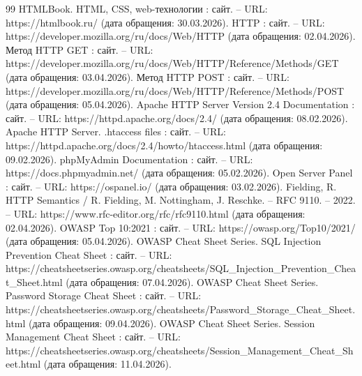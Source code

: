 \begin{thebibliography}{99}
	 HTMLBook. HTML, CSS, web-технологии : сайт. -- URL: https://htmlbook.ru/ (дата обращения: 30.03.2026).
	 HTTP : сайт. -- URL: https://developer.mozilla.org/ru/docs/Web/HTTP (дата обращения: 02.04.2026).
	 Метод HTTP GET : сайт. -- URL: https://developer.mozilla.org/ru/docs/Web/HTTP/Reference/Methods/GET (дата обращения: 03.04.2026).
	 Метод HTTP POST : сайт. -- URL: https://developer.mozilla.org/ru/docs/Web/HTTP/Reference/Methods/POST (дата обращения: 05.04.2026).
	 Apache HTTP Server Version 2.4 Documentation : сайт. -- URL: https://httpd.apache.org/docs/2.4/ (дата обращения: 08.02.2026).
	 Apache HTTP Server. .htaccess files : сайт. -- URL: https://httpd.apache.org/docs/2.4/howto/htaccess.html (дата обращения: 09.02.2026).
	 phpMyAdmin Documentation : сайт. -- URL: https://docs.phpmyadmin.net/ (дата обращения: 05.02.2026).
	 Open Server Panel : сайт. -- URL: https://ospanel.io/ (дата обращения: 03.02.2026).
	 Fielding, R. HTTP Semantics / R. Fielding, M. Nottingham, J. Reschke. -- RFC 9110. -- 2022. -- URL: https://www.rfc-editor.org/rfc/rfc9110.html (дата обращения: 02.04.2026).
	 OWASP Top 10:2021 : сайт. -- URL: https://owasp.org/Top10/2021/ (дата обращения: 05.04.2026).
	 OWASP Cheat Sheet Series. SQL Injection Prevention Cheat Sheet : сайт. -- URL: https://cheatsheetseries.owasp.org/cheatsheets/\allowbreak SQL\_Injection\_Prevention\_Cheat\_Sheet.html (дата обращения: 07.04.2026).
	 OWASP Cheat Sheet Series. Password Storage Cheat Sheet : сайт. -- URL: https://cheatsheetseries.owasp.org/cheatsheets/\allowbreak Password\_Storage\_Cheat\_Sheet.html (дата обращения: 09.04.2026).
	 OWASP Cheat Sheet Series. Session Management Cheat Sheet : сайт. -- URL: https://cheatsheetseries.owasp.org/cheatsheets/\allowbreak Session\_Management\_Cheat\_Sheet.html (дата обращения: 11.04.2026).
	

\end{thebibliography}
